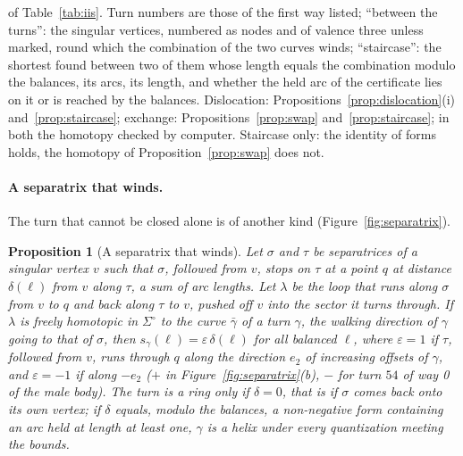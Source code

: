 \documentclass[11pt,a4paper]{article}
\newtheorem{proposition}{Proposition}
\newcommand{\shift}{s}
\newcommand{\lean}[1]{\texttt{\detokenize{#1}}}
\newenvironment{evidence}[3][]{}{}
\begin{document}
\begin{table}[t]
\begin{evidence}[unbreakable]{measured}{on the export of the male body}
{of Table~\ref{tab:iis}. Turn numbers are those of the first way listed;
``between the turns'': the singular vertices, numbered as nodes and of
valence three unless marked, round which the combination of the two curves
winds; ``staircase'': the shortest found between two of them whose length
equals the combination modulo the balances, its arcs, its length, and whether
the held arc of the certificate lies on it or is reached by the balances.
Dislocation: Propositions~\ref{prop:dislocation}(i)
and~\ref{prop:staircase}; exchange: Propositions~\ref{prop:swap}
and~\ref{prop:staircase}; in both the homotopy checked by computer.
Staircase only: the identity of forms holds, the homotopy of
Proposition~\ref{prop:swap} does not.}
\label{tab:pairs}
\end{evidence}
\end{table}

\paragraph{A separatrix that winds.}
The turn that cannot be closed alone is of another kind
(Figure~\ref{fig:separatrix}).

\begin{evidence}{prose}{one step in Lean, the conjugation: \lean{Motion.conj_translation}; on 25 winding separatrices of random tori no strip beside them had the shift $\delta$, the homotopy not being checked}
\begin{proposition}[A separatrix that winds]\label{prop:winding}
Let $\sigma$ and $\tau$ be separatrices of a singular vertex $v$ such that
$\sigma$, followed from $v$, stops on $\tau$ at a point $q$ at distance
$\delta(\ell)$ from $v$ along $\tau$, a sum of arc lengths. Let $\lambda$ be
the loop that runs along $\sigma$ from $v$ to $q$ and back along $\tau$ to $v$,
pushed off $v$ into the sector it turns through. If $\lambda$ is freely
homotopic in $\Sigma^\circ$ to the curve $\bar\gamma$ of a turn $\gamma$, the
walking direction of $\gamma$ going to that of $\sigma$, then
$\shift_\gamma(\ell) = \varepsilon\,\delta(\ell)$ for all balanced $\ell$, where
$\varepsilon = 1$ if $\tau$, followed from $v$, runs through $q$ along the
direction $e_2$ of increasing offsets of $\gamma$, and $\varepsilon = -1$ if
along $-e_2$ ($+$ in Figure~\ref{fig:separatrix}(b), $-$ for turn $54$ of way
0 of the male body). The turn is a
ring only if $\delta = 0$, that is if $\sigma$ comes back onto its own vertex;
if $\delta$ equals, modulo the balances, a non-negative form containing an arc
held at length at least one, $\gamma$ is a helix under every quantization
meeting the bounds.
\end{proposition}
\end{evidence}
\end{document}

